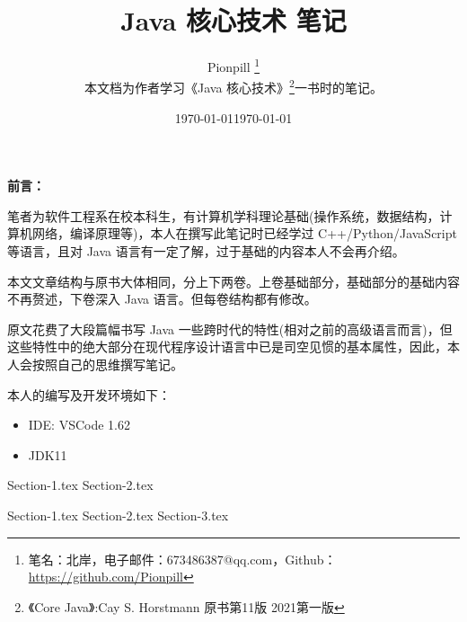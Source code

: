 \documentclass{PionpillNote-book}
\title{Java 核心技术 笔记}
\author{
    Pionpill \footnote{笔名：北岸，电子邮件：673486387@qq.com，Github：\url{https://github.com/Pionpill}} \\
    本文档为作者学习《Java 核心技术》\footnote{《Core Java》:Cay S. Horstmann 原书第11版 2021第一版}一书时的笔记。\\
}
\date{\today}
\begin{document}
\pagestyle{plain}
\maketitle

\noindent\textbf{前言：}

笔者为软件工程系在校本科生，有计算机学科理论基础(操作系统，数据结构，计算机网络，编译原理等)，本人在撰写此笔记时已经学过 C++/Python/JavaScript 等语言，且对 Java 语言有一定了解，过于基础的内容本人不会再介绍。

本文文章结构与原书大体相同，分上下两卷。上卷基础部分，基础部分的基础内容不再赘述，下卷深入 Java 语言。但每卷结构都有修改。

原文花费了大段篇幅书写 Java 一些跨时代的特性(相对之前的高级语言而言)，但这些特性中的绝大部分在现代程序设计语言中已是司空见惯的基本属性，因此，本人会按照自己的思维撰写笔记。

本人的编写及开发环境如下：
\begin{itemize}
    \item IDE: VSCode 1.62
    \item JDK11
\end{itemize}

\date{\today}
\newpage

\tableofcontents

\newpage

\setcounter{page}{1} 
\pagestyle{fancy}


{Section-1.tex}
{Section-2.tex}

{Section-1.tex}
{Section-2.tex}
{Section-3.tex}
\end{document}
